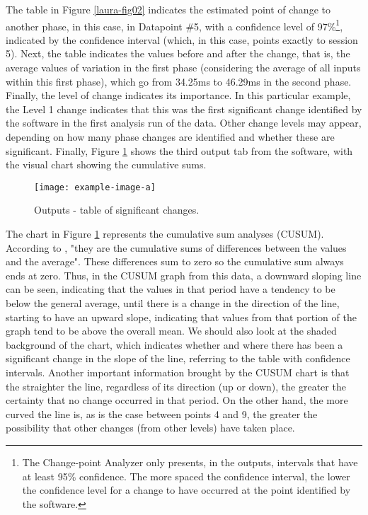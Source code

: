 The table in Figure \ref{laura-fig02} indicates the estimated point of change to another phase,
in this case, in Datapoint \#5, with a confidence level of 97\%\footnote{The
Change-point Analyzer only presents, in the outputs, intervals that have at
least 95\% confidence. The more spaced the confidence interval, the lower the
confidence level for a change to have occurred at the point identified by the
software.}, indicated by the confidence interval (which, in this case, points
exactly to session 5). Next, the table indicates the values before and after
the change, that is, the average values of variation in the first phase
(considering the average of all inputs within this first phase), which go from
34.25ms to 46.29ms in the second phase. Finally, the level of change indicates
its importance. In this particular example, the Level 1 change indicates that
this was the first significant change identified by the software in the first
analysis run of the data. Other change levels may appear, depending on how many
phase changes are identified and whether these are significant. Finally, Figure
\ref{laura-fig03} shows the third output tab from the software, with the visual chart showing
the cumulative sums.

\begin{figure}[h]
\centering
\texttt{[image: example-image-a]}
\caption{Outputs - table of significant changes.} 
\label{laura-fig03}
\end{figure}

The chart in Figure \ref{laura-fig03} represents the cumulative sum analyses (CUSUM).
According to \citet[p.~6]{taylorwayne}, "they are the cumulative sums of differences
between the values and the average". These differences sum to zero so the
cumulative sum always ends at zero. Thus, in the CUSUM graph from this data, a
downward sloping line can be seen, indicating that the values in that period
have a tendency to be below the general average, until there is a change in the
direction of the line, starting to have an upward slope, indicating that values
from that portion of the graph tend to be above the overall mean. We should
also look at the shaded background of the chart, which indicates whether and
where there has been a significant change in the slope of the line, referring
to the table with confidence intervals. Another important information brought
by the CUSUM chart is that the straighter the line, regardless of its direction
(up or down), the greater the certainty that no change occurred in that period.
On the other hand, the more curved the line is, as is the case between points 4
and 9, the greater the possibility that other changes (from other levels) have
taken place.


